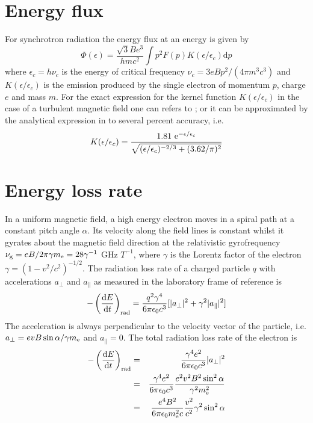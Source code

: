 \documentclass[12pt,a4paper]{article}
\newcommand{\dif}{\mathrm{d}}
\begin{document}
\section{Energy flux}
For synchrotron radiation the energy flux at an energy is given by \cite{2009A&A...497...17V}
\begin{equation}
\Phi(\epsilon) = \frac{\sqrt{3} B e^3}{h mc^2} \int p^2 F(p) K(\epsilon/\epsilon_c) \dif p
\end{equation}
where $\epsilon_c = h\nu_c$ is the energy of critical frequency $\nu_c = 3eBp^2/(4\pi m^3 c^3)$ and $K(\epsilon/\epsilon_c)$ is the emission produced by the single electron of momentum $p$, charge $e$ and mass $m$. For the exact expression for the kernel function $K(\epsilon/\epsilon_c)$ in the case of a turbulent magnetic field one can refers to \cite{1986A&A...164L..16C}; or it can be approximated by the analytical expression in \cite{2007A&A...465..695Z} to several percent accuracy, i.e.
\begin{equation}
K(\epsilon/\epsilon_c) = \frac{1.81~ {\rm e}^{-\epsilon/\epsilon_c}}{\sqrt{(\epsilon/\epsilon_c)^{-2/3} +(3.62/\pi)^2}} 
\end{equation}

\section{Energy loss rate}
In a uniform magnetic field, a high energy electron moves in a spiral path at a constant pitch angle $\alpha$. Its velocity along the field lines is constant whilst it gyrates about the magnetic field direction at the relativistic gyrofrequency $\nu_{\rm g} = eB/2\pi \gamma m_{\rm e} = 28 \gamma^{-1}$ GHz $T^{-1}$, where $\gamma$ is the Lorentz factor of the electron $\gamma = (1-v^2/c^2)^{-1/2}$. The radiation loss rate of a charged particle $q$ with accelerations $a_{\perp}$ and $a_{\parallel}$ as measured in the laboratory frame of reference is
\begin{equation}
-\left(\frac{\dif E}{\dif t} \right)_{\rm rad} = \frac{q^2 \gamma^4}{6\pi \epsilon_0 c^3} [|a_{\perp}|^2 +\gamma^2 |a_{\parallel}|^2]
\end{equation}
The acceleration is always perpendicular to the velocity vector of the particle, i.e. $a_{\perp} = evB \sin \alpha/\gamma m_{\rm e}$ and $a_{\parallel} = 0$. The total radiation loss rate of the electron is
\begin{eqnarray}
\nonumber -\left(\frac{\dif E}{\dif t} \right)_{\rm rad} &=& \frac{\gamma^4 e^2}{6\pi \epsilon_0 c^3} |a_{\perp}|^2 \\
\nonumber &=& \frac{\gamma^4 e^2}{6\pi \epsilon_0 c^3} \frac{e^2 v^2 B^2 \sin^2 \alpha}{\gamma^2 m^2_{\rm e}} \\
&=& \frac{e^4 B^2}{6\pi \epsilon_0 m^2_{\rm e} c} \frac{v^2}{c^2} \gamma^2 \sin^2 \alpha 
\end{eqnarray}
\end{document}
